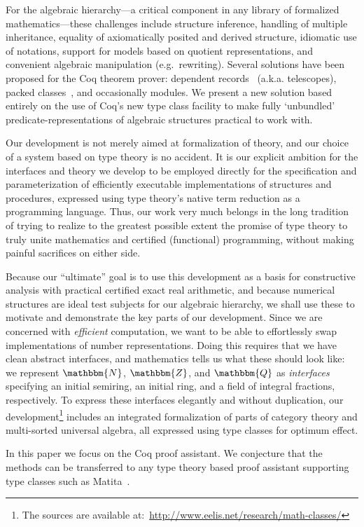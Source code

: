 \documentclass[a4paper,10pt,runningheads]{llncs}
\newcommand{\N}{\ensuremath{\mathbbm{N}}}
\newcommand{\Z}{\ensuremath{\mathbbm{Z}}}
\newcommand{\Q}{\ensuremath{\mathbbm{Q}}}
\begin{document}
For the algebraic hierarchy---a critical component in any library of formalized mathematics---these challenges include structure inference, handling of multiple inheritance, equality of axiomatically posited and derived structure, idiomatic use of notations, support for models based on quotient representations, and convenient algebraic manipulation (e.g.\ rewriting). Several solutions have been proposed for the Coq theorem prover: dependent records~\cite{DBLP:journals/jsc/GeuversPWZ02} (a.k.a. telescopes), packed classes~\cite{Packed}, and occasionally modules. We present a new solution based entirely on the use of Coq's new type class facility to make fully `unbundled' predicate-representations of algebraic structures practical to work with.

Our development is not merely aimed at formalization of theory, and our choice of a system based on type theory is no accident. It is our explicit ambition for the interfaces and theory we develop to be employed directly for the specification and parameterization of efficiently executable implementations of structures and procedures, expressed using type theory's native term reduction as a programming language. Thus, our work very much belongs in the long tradition of trying to realize to the greatest possible extent the promise of type theory to truly unite mathematics and certified (functional) programming, without making painful sacrifices on either side.

Because our ``ultimate'' goal is to use this development as a basis for constructive analysis with practical certified exact real arithmetic, and because numerical structures are ideal test subjects for our algebraic hierarchy, we shall use these to motivate and demonstrate the key parts of our development. Since we are concerned with \emph{efficient} computation, we want to be able to effortlessly swap implementations of number representations. Doing this requires that we have clean abstract interfaces, and mathematics tells us what these should look like: we represent $\N$, $\Z$, and $\Q$ as \emph{interfaces} specifying an initial semiring, an initial ring, and a field of integral fractions, respectively. To express these interfaces elegantly and without duplication, our development\footnote{The sources are available at:~\url{http://www.eelis.net/research/math-classes/}} includes an integrated formalization of parts of category theory and multi-sorted universal algebra, all expressed using type classes for optimum effect.

In this paper we focus on the Coq proof assistant. We conjecture that the methods can be transferred
to any type theory based proof assistant supporting type classes such as
Matita~\cite{asperti2007user}.
\end{document}
